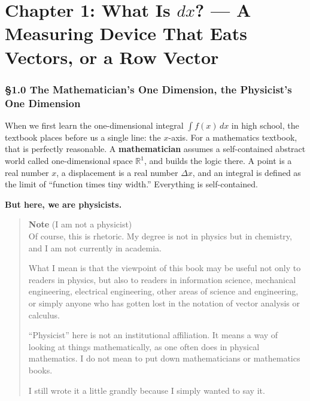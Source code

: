 \hypertarget{chapter-1-what-is-dx-a-measuring-device-that-eats-vectors-or-a-row-vector}{%
\chapter{\texorpdfstring{Chapter 1: What Is \(dx\)? --- A Measuring
Device That Eats Vectors, or a Row
Vector}{Chapter 1: What Is dx? --- A Measuring Device That Eats Vectors, or a Row Vector}}\label{chapter-1-what-is-dx-a-measuring-device-that-eats-vectors-or-a-row-vector}}

\hypertarget{the-mathematicians-one-dimension-the-physicists-one-dimension}{%
\subsection{§1.0 The Mathematician's One Dimension, the Physicist's One
Dimension}\label{the-mathematicians-one-dimension-the-physicists-one-dimension}}

When we first learn the one-dimensional integral \(\int f(x)\,dx\) in
high school, the textbook places before us a single line: the
\(x\)-axis. For a mathematics textbook, that is perfectly reasonable. A
\textbf{mathematician} assumes a self-contained abstract world called
one-dimensional space \(\mathbb{R}^1\), and builds the logic there. A
point is a real number \(x\), a displacement is a real number
\(\Delta x\), and an integral is defined as the limit of ``function
times tiny width.'' Everything is self-contained.

\textbf{But here, we are physicists.}

\begin{quote}
\textbf{Note} (I am not a physicist)\\
Of course, this is rhetoric. My degree is not in physics but in
chemistry, and I am not currently in academia.

What I mean is that the viewpoint of this book may be useful not only to
readers in physics, but also to readers in information science,
mechanical engineering, electrical engineering, other areas of science
and engineering, or simply anyone who has gotten lost in the notation of
vector analysis or calculus.

``Physicist'' here is not an institutional affiliation. It means a way
of looking at things mathematically, as one often does in physical
mathematics. I do not mean to put down mathematicians or mathematics
books.

I still wrote it a little grandly because I simply wanted to say it.
\end{quote}

